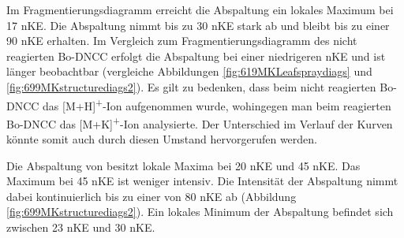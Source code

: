 Im Fragmentierungsdiagramm erreicht die  Abspaltung ein lokales Maximum bei 17 \gls{nKE}. Die Abspaltung nimmt bis zu 30 \gls{nKE} stark ab und bleibt bis zu einer 90 \gls{nKE} erhalten. Im Vergleich zum Fragmentierungsdiagramm des nicht reagierten Bo-DNCC erfolgt die  Abspaltung bei einer niedrigeren \gls{nKE} und ist länger beobachtbar (vergleiche Abbildungen \ref{fig:619MKLeafspraydiags} und \ref{fig:699MKstructurediags2}). Es gilt zu bedenken, dass beim nicht reagierten Bo-DNCC das [M+H]\textsuperscript{+}-Ion aufgenommen wurde, wohingegen man beim reagierten Bo-DNCC das [M+K]\textsuperscript{+}-Ion analysierte. Der Unterschied im Verlauf der Kurven könnte somit auch durch diesen Umstand hervorgerufen werden.

Die Abspaltung von  besitzt lokale Maxima bei 20 \gls{nKE} und 45 \gls{nKE}. Das Maximum bei 45 \gls{nKE} ist weniger intensiv. Die Intensität der Abspaltung nimmt dabei kontinuierlich bis zu einer von 80 \gls{nKE} ab (Abbildung \ref{fig:699MKstructurediags2}). Ein lokales Minimum der Abspaltung befindet sich zwischen 23 \gls{nKE} und 30 \gls{nKE}. \\

